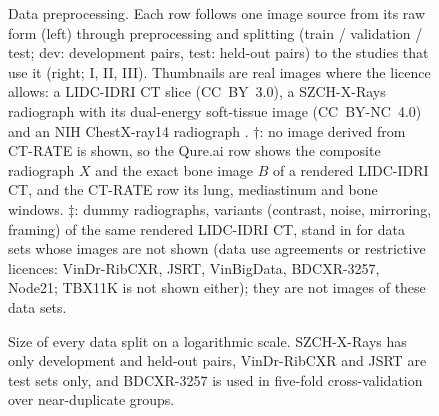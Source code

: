 \begin{figure}[htbp]
\centering
{}
\caption{Data preprocessing. Each row follows one image source from its raw form (left) through preprocessing and splitting (train /
validation / test; dev: development pairs, test: held-out pairs) to the studies that use it (right; I, II, III). Thumbnails are real images
where the licence allows: a LIDC-IDRI CT slice \citep{armato2015lidctcia} (CC~BY~3.0), a SZCH-X-Rays radiograph with its dual-energy
soft-tissue image \citep{sun2026bsldm} (CC~BY-NC~4.0) and an NIH ChestX-ray14 radiograph \citep{wang2017chestxray}. $\dagger$: no image
derived from CT-RATE is shown, so the Qure.ai row shows the composite radiograph $X$ and the exact bone image $B$ of a rendered LIDC-IDRI
CT, and the CT-RATE row its lung, mediastinum and bone windows. $\ddagger$: dummy radiographs, variants (contrast, noise, mirroring,
framing) of the same rendered LIDC-IDRI CT, stand in for data sets whose images are not shown (data use agreements or restrictive
licences: VinDr-RibCXR, JSRT, VinBigData, BDCXR-3257, Node21; TBX11K is not shown either); they are not images of these data sets.}
\label{fig:data_pipeline}
\end{figure}

\begin{figure}[htbp]
\centering
{}
\caption{Size of every data split on a logarithmic scale. SZCH-X-Rays has only development and held-out pairs, VinDr-RibCXR and JSRT are
test sets only, and BDCXR-3257 is used in five-fold cross-validation over near-duplicate groups.}
\label{fig:data_splits}
\end{figure}

